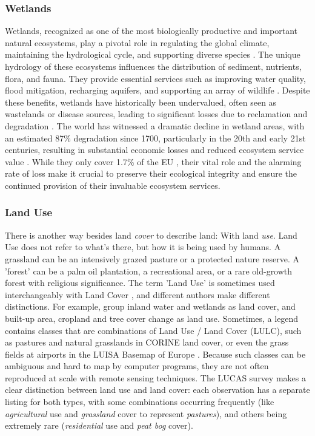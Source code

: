     \subsubsection{Wetlands}

        Wetlands, recognized as one of the most biologically productive and important natural ecosystems, play a pivotal role in regulating the global climate, maintaining the hydrological cycle, and supporting diverse species \citep{hu2017global,ramsar2001wetlands}. The unique hydrology of these ecosystems influences the distribution of sediment, nutrients, flora, and fauna. They provide essential services such as improving water quality, flood mitigation, recharging aquifers, and supporting an array of wildlife \citep{costanza1997value,smardon2009sustaining}. Despite these benefits, wetlands have historically been undervalued, often seen as wastelands or disease sources, leading to significant losses due to reclamation and degradation \citep{giblett1996postmodern,owens2001global,davidson2014much,gardner2018global,dugan1993wetlands,oecd1996guidelines,ramsar2015wetlands}. The world has witnessed a dramatic decline in wetland areas, with an estimated 87\% degradation since 1700, particularly in the 20th and early 21st centuries, resulting in substantial economic losses and reduced ecosystem service value \citep{gardner2015state,costanza2014changes}. While they only cover 1.7\% of the EU \citep{eurostat2021land}, their vital role and the alarming rate of loss make it crucial to preserve their ecological integrity and ensure the continued provision of their invaluable ecosystem services.

    \subsubsection{Land Use}

        There is another way besides land \textit{cover} to describe land: With land \textit{use}. Land Use does not refer to what's there, but how it is being used by humans. A grassland can be an intensively grazed pasture or a protected nature reserve. A 'forest' can be a palm oil plantation, a recreational area, or a rare old-growth forest with religious significance. The term 'Land Use' is sometimes used interchangeably with Land Cover \citep{fisher2005land}, and different authors make different distinctions. For example, \citet{hansen2022global} group inland water and wetlands as land cover, and built-up area, cropland and tree cover change as land use. Sometimes, a legend contains classes that are combinations of Land Use / Land Cover (LULC), such as pastures and natural grasslands in CORINE land cover, or even the grass fields at airports in the LUISA Basemap of Europe \citep{pigaiani2021luisa}. Because such classes can be ambiguous and hard to map by computer programs, they are not often reproduced at scale with remote sensing techniques. The LUCAS survey makes a clear distinction between land use and land cover: each observation has a separate listing for both types, with some combinations occurring frequently (like \textit{agricultural} use and \textit{grassland} cover to represent \textit{pastures}), and others being extremely rare (\textit{residential} use and \textit{peat bog} cover).

